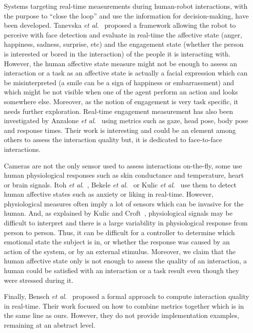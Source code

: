 \documentclass[a4paper,11pt,twoside]{StyleThese}
\begin{document}
Systems targeting real-time measurements during human-robot interactions, with the purpose to ``close the loop'' and use the information for decision-making, have been developed. Tanevska \textit{et al}.~\cite{tanevska:hal-01615491} proposed a framework allowing the robot to perceive with face detection and evaluate in real-time the affective state (\ie anger, happiness, sadness, surprise, etc) and the engagement state (\ie whether the person is interested or bored in the interaction) of the people it is interacting with. However, the human affective state measure might not be enough to assess an interaction or a task as an affective state is actually a facial expression which can be misinterpreted (\eg a smile can be a sign of happiness or embarrassment) and which might be not visible when one of the agent perform an action and looks somewhere else. Moreover, as the notion of engagement is very task specific, it needs further exploration. Real-time engagement measurement has also been investigated by Anzalone \textit{et al}.~\cite{anzalone_2015_evaluating} using metrics such as gaze, head pose, body pose and response times. Their work is interesting and could be an element among others to assess the interaction quality but, it is dedicated to face-to-face interactions. 

Cameras are not the only sensor used to assess interactions on-the-fly, some use human physiological responses such as skin conductance and temperature, heart or brain signals. Itoh \textit{et al}.~\cite{itoh2006}, Bekele \textit{et al}.~\cite{bekele_2014} or Kulic \textit{et al}.~\cite{kulic2007} use them to detect human affective states such as anxiety or liking in real-time. However, physiological measures often imply a lot of sensors which can be invasive for the human. And, as explained by Kulic and Croft~\cite{kulic_2003_estimating}, physiological signals may be difficult to interpret and there is a large variability in physiological response from person to person. Thus, it can be difficult for a controller to determine which emotional state the subject is in, or whether the response was caused by an action of the system, or by an external stimulus. Moreover, we claim that the human affective state only is not enough to assess the quality of an interaction, a human could be satisfied with an interaction or a task result even though they were stressed during it.

Finally,  Bensch \textit{et al}.~\cite{bensch17} proposed a formal approach to compute interaction quality in real-time. Their work focused on how to combine metrics together which is in the same line as ours. However, they do not provide implementation examples, remaining at an abstract level.
\end{document}
